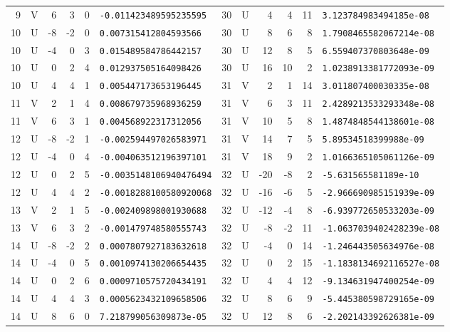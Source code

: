 \begin{longtable}{rcrrrl|rcrrrl}
9 & V & 6 & 3 & 0 & \texttt{-0.011423489595235595} & 30 & U & 4 & 4 & 11 & \texttt{3.123784983494185e-08}\\
10 & U & -8 & -2 & 0 & \texttt{0.007315412804593566} & 30 & U & 8 & 6 & 8 & \texttt{1.7908465582067214e-08}\\
10 & U & -4 & 0 & 3 & \texttt{0.015489584786442157} & 30 & U & 12 & 8 & 5 & \texttt{6.559407370803648e-09}\\
10 & U & 0 & 2 & 4 & \texttt{0.012937505164098426} & 30 & U & 16 & 10 & 2 & \texttt{1.0238913381772093e-09}\\
10 & U & 4 & 4 & 1 & \texttt{0.005447173653196445} & 31 & V & 2 & 1 & 14 & \texttt{3.011807400030335e-08}\\
11 & V & 2 & 1 & 4 & \texttt{0.008679735968936259} & 31 & V & 6 & 3 & 11 & \texttt{2.4289213533293348e-08}\\
11 & V & 6 & 3 & 1 & \texttt{0.004568922317312056} & 31 & V & 10 & 5 & 8 & \texttt{1.4874848544138601e-08}\\
12 & U & -8 & -2 & 1 & \texttt{-0.002594497026583971} & 31 & V & 14 & 7 & 5 & \texttt{5.89534518399988e-09}\\
12 & U & -4 & 0 & 4 & \texttt{-0.004063512196397101} & 31 & V & 18 & 9 & 2 & \texttt{1.0166365105061126e-09}\\
12 & U & 0 & 2 & 5 & \texttt{-0.0035148106940476494} & 32 & U & -20 & -8 & 2 & \texttt{-5.631565581189e-10}\\
12 & U & 4 & 4 & 2 & \texttt{-0.0018288100580920068} & 32 & U & -16 & -6 & 5 & \texttt{-2.966690985151939e-09}\\
13 & V & 2 & 1 & 5 & \texttt{-0.002409898001930688} & 32 & U & -12 & -4 & 8 & \texttt{-6.939772650533203e-09}\\
13 & V & 6 & 3 & 2 & \texttt{-0.001479748580555743} & 32 & U & -8 & -2 & 11 & \texttt{-1.0637039402428239e-08}\\
14 & U & -8 & -2 & 2 & \texttt{0.0007807927183632618} & 32 & U & -4 & 0 & 14 & \texttt{-1.246443505634976e-08}\\
14 & U & -4 & 0 & 5 & \texttt{0.0010974130206654435} & 32 & U & 0 & 2 & 15 & \texttt{-1.1838134692116527e-08}\\
14 & U & 0 & 2 & 6 & \texttt{0.0009710575720434191} & 32 & U & 4 & 4 & 12 & \texttt{-9.134631947400254e-09}\\
14 & U & 4 & 4 & 3 & \texttt{0.0005623432109658506} & 32 & U & 8 & 6 & 9 & \texttt{-5.445380598729165e-09}\\
14 & U & 8 & 6 & 0 & \texttt{7.218799056309873e-05} & 32 & U & 12 & 8 & 6 & \texttt{-2.202143392626381e-09}\\

\end{longtable}
